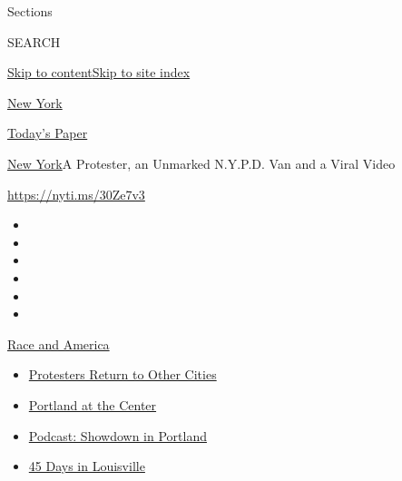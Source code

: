 Sections

SEARCH

\protect\hyperlink{site-content}{Skip to
content}\protect\hyperlink{site-index}{Skip to site index}

\href{https://www.nytimes.com/section/nyregion}{New York}

\href{https://myaccount.nytimes.com/auth/login?response_type=cookie\&client_id=vi}{}

\href{https://www.nytimes.com/section/todayspaper}{Today's Paper}

\href{/section/nyregion}{New York}\textbar{}A Protester, an Unmarked
N.Y.P.D. Van and a Viral Video

\url{https://nyti.ms/30Ze7v3}

\begin{itemize}
\item
\item
\item
\item
\item
\item
\end{itemize}

\href{https://www.nytimes.com/news-event/george-floyd-protests-minneapolis-new-york-los-angeles?action=click\&pgtype=Article\&state=default\&region=TOP_BANNER\&context=storylines_menu}{Race
and America}

\begin{itemize}
\tightlist
\item
  \href{https://www.nytimes.com/2020/07/26/us/protests-portland-seattle-trump.html?action=click\&pgtype=Article\&state=default\&region=TOP_BANNER\&context=storylines_menu}{Protesters
  Return to Other Cities}
\item
  \href{https://www.nytimes.com/2020/07/24/us/portland-oregon-protests-white-race.html?action=click\&pgtype=Article\&state=default\&region=TOP_BANNER\&context=storylines_menu}{Portland
  at the Center}
\item
  \href{https://www.nytimes.com/2020/07/23/podcasts/the-daily/portland-protests.html?action=click\&pgtype=Article\&state=default\&region=TOP_BANNER\&context=storylines_menu}{Podcast:
  Showdown in Portland}
\item
  \href{https://www.nytimes.com/interactive/2020/07/16/us/black-lives-matter-protests-louisville-breonna-taylor.html?action=click\&pgtype=Article\&state=default\&region=TOP_BANNER\&context=storylines_menu}{45
  Days in Louisville}
\end{itemize}

